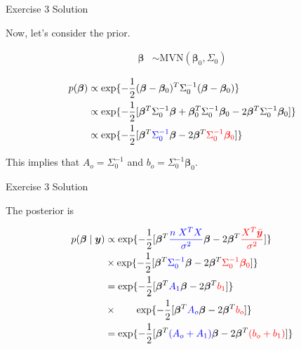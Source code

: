 \documentclass[
  ignorenonframetext,
]{beamer}
\newcommand{\bbeta}{\bm{\beta}}
\begin{document}
\begin{frame}{Exercise 3 Solution}
\protect\hypertarget{exercise-3-solution-1}{}

Now, let's consider the prior.

\begin{align}
\bbeta &\sim \text{MVN}(\bbeta_0, \Sigma_0)
\end{align}

\begin{align}
p(\bbeta) 
&\propto \exp\{-\frac{1}{2}
(\bbeta - \bbeta_0)^T\Sigma_0^{-1}(\bbeta - \bbeta_0)
\} \\
&\propto \exp\{-\frac{1}{2}
[\bbeta^T \Sigma_0^{-1} \bbeta +\bbeta_0^T\Sigma_0^{-1}\bbeta_0 - 2 \bbeta^T\Sigma_0^{-1}\bbeta_0]
\} \\
&\propto \exp\{-\frac{1}{2}
[\bbeta^T \textcolor{blue}{\Sigma_0^{-1}} \bbeta - 2 \bbeta^T\textcolor{red}{\Sigma_0^{-1}\bbeta_0}]
\} 
\end{align}

This implies that \(A_o = \Sigma_0^{-1}\) and
\(b_o = \Sigma_0^{-1}\bbeta_0.\)

\end{frame}

\begin{frame}{Exercise 3 Solution}
\protect\hypertarget{exercise-3-solution-2}{}

The posterior is

\begin{align}
p(\bbeta \mid \bm{y}) &\propto
\exp\{-\frac{1}{2}
[
\bbeta^T\textcolor{blue}{\frac{n\;X^TX}{\sigma^2}}\bbeta - 2\bbeta^T\textcolor{red}{\frac{X^T\bar{\bm{y}}}{\sigma^2}}
]
\}\\
&\times
\exp\{-\frac{1}{2}
[\bbeta^T \textcolor{blue}{\Sigma_0^{-1}} \bbeta - 2 \bbeta^T\textcolor{red}{\Sigma_0^{-1}\bbeta_0}]
\} \\
&= \exp\{-\frac{1}{2}
[
\bbeta^T \textcolor{blue}{A_1} \bbeta - 2\bbeta^T \textcolor{red}{b_1}
]
\}\\
&\times \qquad \exp\{-\frac{1}{2}
[
\bbeta^T \textcolor{blue}{A_o} \bbeta - 2\bbeta^T \textcolor{red}{b_o}
]
\} \\
&= \exp\{-\frac{1}{2}
[
\bbeta^T \textcolor{blue}{(A_o + A_1)} \bbeta - 2\bbeta^T \textcolor{red}{(b_o + b_1)}
]
\}
\end{align}

\end{frame}
\end{document}
